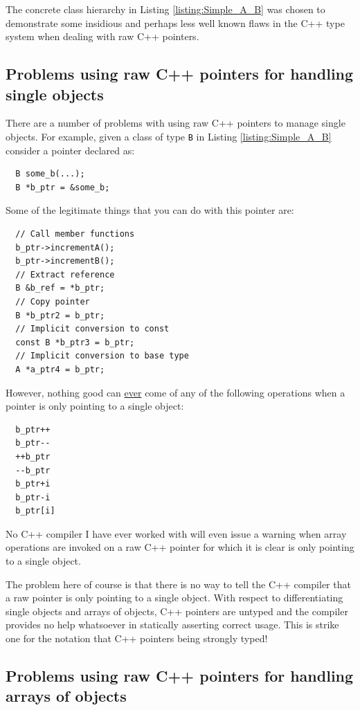 \documentclass[pdf,ps2pdf,11pt]{SANDreport}
\begin{document}
The concrete class hierarchy in Listing {}\ref{listing:Simple_A_B} was
chosen to demonstrate some insidious and perhaps less well known flaws
in the C++ type system when dealing with raw C++ pointers.


%
{}\subsection{Problems using raw C++ pointers for handling single objects}
%

There are a number of problems with using raw C++ pointers to manage
single objects.  For example, given a class of type {}\texttt{B} in
Listing {}\ref{listing:Simple_A_B} consider a pointer declared as:

{\small\begin{verbatim}
  B some_b(...);
  B *b_ptr = &some_b;
\end{verbatim}}

Some of the legitimate things that you can do with this pointer are:

{\small\begin{verbatim}
  // Call member functions
  b_ptr->incrementA();
  b_ptr->incrementB();
  // Extract reference
  B &b_ref = *b_ptr;
  // Copy pointer
  B *b_ptr2 = b_ptr;
  // Implicit conversion to const
  const B *b_ptr3 = b_ptr;
  // Implicit conversion to base type
  A *a_ptr4 = b_ptr;
\end{verbatim}}

However, nothing good can {}\underline{ever} come of any of the
following operations when a pointer is only pointing to a single
object:

{\small\begin{verbatim}
  b_ptr++
  b_ptr--
  ++b_ptr
  --b_ptr
  b_ptr+i
  b_ptr-i
  b_ptr[i]
\end{verbatim}}

No C++ compiler I have ever worked with will even issue a warning when
array operations are invoked on a raw C++ pointer for which it is
clear is only pointing to a single object.

The problem here of course is that there is no way to tell the C++
compiler that a raw pointer is only pointing to a single object.  With
respect to differentiating single objects and arrays of objects, C++
pointers are untyped and the compiler provides no help whatsoever in
statically asserting correct usage.  This is strike one for the
notation that C++ pointers being strongly typed!


%
{}\subsection{Problems using raw C++ pointers for handling arrays of
objects}
\label{sec:problem-with-raw-array-pointers}
%
\end{document}
